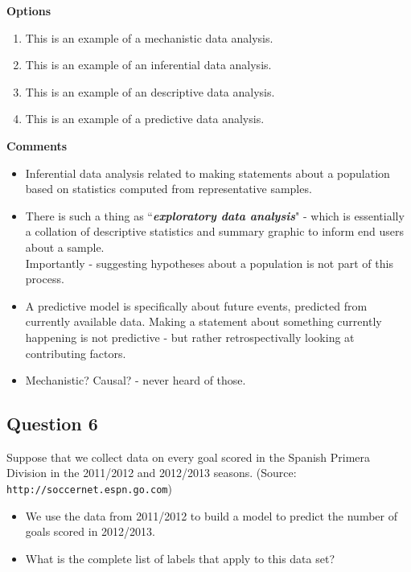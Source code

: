 \documentclass[]{article}
\begin{document}
\noindent \textbf{Options}
\begin{enumerate}
\item This is an example of a mechanistic data analysis.
\item This is an example of an inferential data analysis.
\item This is an example of an descriptive data analysis.
\item This is an example of a predictive data analysis.
\end{enumerate}

\noindent \textbf{Comments}
\begin{itemize}
\item Inferential data analysis related to making statements about a population based on statistics computed from representative samples.

\item There is such a thing as ``\textit{\textbf{exploratory data analysis}}" - which is essentially a collation of descriptive statistics and summary graphic to inform end users about a sample. \\ Importantly - suggesting hypotheses about a population is not part of this process.

\item A predictive model is specifically about future events, predicted from currently available data. Making a statement about something currently happening is not predictive - but rather retrospectivally looking at contributing factors.

\item Mechanistic?  Causal? - never heard of those.
\end{itemize}
\newpage
\subsection*{Question 6}
Suppose that we collect data on every goal scored in the Spanish Primera Division in the 2011/2012 and 2012/2013 seasons. (Source: \texttt{http://soccernet.espn.go.com})

\begin{itemize}
\item We use the data from 2011/2012 to build a model to predict the number of goals scored in 2012/2013.
\item What is the complete list of labels that apply to this data set?
\end{itemize} 
\end{document}
